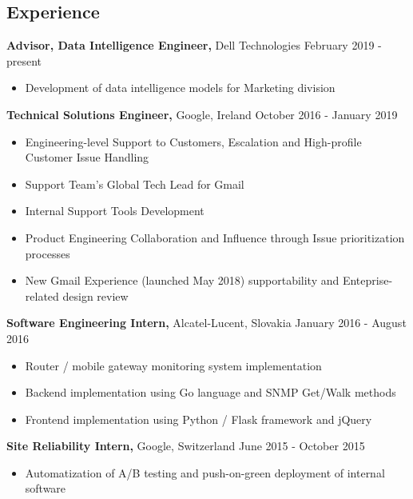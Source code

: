 \documentclass[margin]{res}
\begin{document}
\begin{resume}


\section{Experience}

{\bf Advisor, Data Intelligence Engineer,} Dell Technologies \hfill February 2019 - present
\begin{itemize} \itemsep -2pt
\item Development of data intelligence models for Marketing division
\end{itemize}

{\bf Technical Solutions Engineer,} Google, Ireland \hfill October 2016 - January 2019
\begin{itemize} \itemsep -2pt %
\item Engineering-level Support to Customers, Escalation and High-profile Customer Issue Handling
\item Support Team's Global Tech Lead for Gmail
\item Internal Support Tools Development
\item Product Engineering Collaboration and Influence through Issue prioritization processes
\item New Gmail Experience (launched May 2018) supportability and Enteprise-related design review
\end{itemize}

{\bf Software Engineering Intern,} Alcatel-Lucent, Slovakia \hfill January 2016 - August 2016
\begin{itemize} \itemsep -2pt %
\item Router / mobile gateway monitoring system implementation
\item Backend implementation using Go language and SNMP Get/Walk methods
\item Frontend implementation using Python / Flask framework and jQuery
\end{itemize}

{\bf Site Reliability Intern,} Google, Switzerland \hfill June 2015 - October 2015
\begin{itemize} \itemsep -2pt %
\item Automatization of A/B testing and push-on-green deployment of internal software
\end{itemize}


\end{resume}
\end{document}
